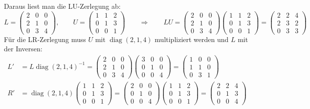 Daraus liest man die LU-Zerlegung ab:
\[
L
=
\begin{pmatrix}
2&0&0\\
2&1&0\\
0&3&4
\end{pmatrix},
\qquad
U
=
\begin{pmatrix}
1&1&2\\
0&1&3\\
0&0&1
\end{pmatrix}
\qquad
\Rightarrow
\qquad
LU=
\begin{pmatrix}
2&0&0\\
2&1&0\\
0&3&4
\end{pmatrix}
\begin{pmatrix}
1&1&2\\
0&1&3\\
0&0&1
\end{pmatrix}
=
\begin{pmatrix}
2&2&4\\
2&3&2\\
0&3&3
\end{pmatrix}
\]
Für die LR-Zerlegung muss $U$ mit $\operatorname{diag}(2,1,4)$
multipliziert werden und $L$ mit der Inversen:
\begin{align*}
L'
&=
L\operatorname{diag}(2,1,4)^{-1}
=
\begin{pmatrix}
2&0&0\\
2&1&0\\
0&3&4
\end{pmatrix}
\begin{pmatrix}
3&0&0\\
0&1&0\\
0&0&4
\end{pmatrix}
=
\begin{pmatrix}
1&0&0\\
1&1&0\\
0&3&1
\end{pmatrix}
\\
R'
&=
\operatorname{diag}(2,1,4)
\begin{pmatrix}
1&1&2\\
0&1&3\\
0&0&1
\end{pmatrix}
=
\begin{pmatrix}
2&0&0\\
0&1&0\\
0&0&4
\end{pmatrix}
\begin{pmatrix}
1&1&2\\
0&1&3\\
0&0&1
\end{pmatrix}
=
\begin{pmatrix}
2&2&4\\
0&1&3\\
0&0&4
\end{pmatrix}
\end{align*}
